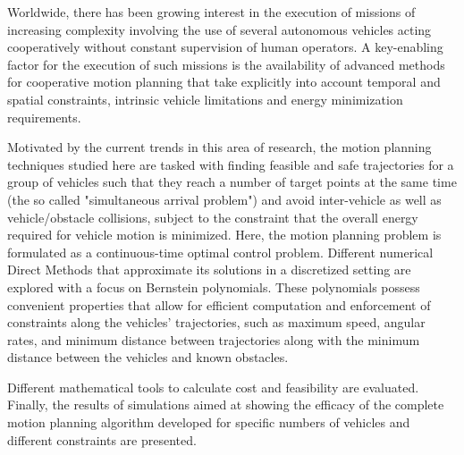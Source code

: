 \noindent

\par Worldwide, there has been growing interest in  the execution of missions of increasing complexity involving the use of several autonomous vehicles acting cooperatively without constant supervision of human operators. A key-enabling factor for the execution of such missions is the availability of advanced methods for cooperative motion planning that take explicitly into account temporal and spatial constraints, intrinsic vehicle limitations and energy minimization requirements.
\par Motivated by the current trends in this area of research, the motion planning techniques studied here are tasked with finding feasible and safe trajectories for a group of vehicles such that they reach a number of target points at the same time (the so called "simultaneous arrival problem") and avoid inter-vehicle as well as vehicle/obstacle collisions, subject to the constraint that the overall energy required for vehicle motion is minimized.
Here, the motion planning problem is formulated as a continuous-time optimal control problem. Different numerical Direct Methods that approximate its solutions in a discretized setting are explored with a focus on Bernstein polynomials. These polynomials possess convenient properties that allow for efficient computation and enforcement of constraints along the vehicles’ trajectories, such as maximum speed, angular rates, and minimum distance between trajectories along with the minimum distance between the vehicles and known obstacles.
\par Different mathematical tools to calculate cost and feasibility are evaluated. Finally, the results of simulations aimed at showing the efficacy of the complete motion planning algorithm developed for specific numbers of vehicles and different constraints are presented.